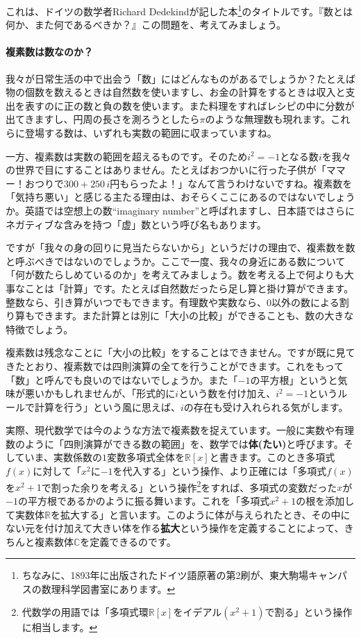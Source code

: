 これは、ドイツの数学者Richard Dedekindが記した本\footnote{ちなみに、1893年に出版されたドイツ語原著の第2刷が、東大駒場キャンパスの数理科学図書室にあります。}のタイトルです。『数とは何か、また何であるべきか？』この問題を、考えてみましょう。

\paragraph{複素数は数なのか？}

我々が日常生活の中で出会う「数」にはどんなものがあるでしょうか？たとえば物の個数を数えるときは自然数を使いますし、お金の計算をするときは収入と支出を表すのに正の数と負の数を使います。また料理をすればレシピの中に分数が出てきますし、円周の長さを測ろうとしたら$\pi$のような無理数も現れます。これらに登場する数は、いずれも実数の範囲に収まっていますね。

一方、複素数は実数の範囲を超えるものです。そのため$i^2=-1$となる数$i$を我々の世界で目にすることはありません。たとえばおつかいに行った子供が「ママー！\negthinspace おつりで$300+250\,i$円もらったよ！」なんて言うわけないですね。複素数を「気持ち悪い」と感じる主たる理由は、おそらくここにあるのではないでしょうか。英語では空想上の数``imaginary number''と呼ばれますし、日本語ではさらにネガティブな含みを持つ「虚」数という呼び名もあります。

ですが「我々の身の回りに見当たらないから」というだけの理由で、複素数を数と呼ぶべきではないのでしょうか。ここで一度、我々の身近にある数について「何が数たらしめているのか」を考えてみましょう。数を考える上で何よりも大事なことは「計算」です。たとえば自然数だったら足し算と掛け算ができます。整数なら、引き算がいつでもできます。有理数や実数なら、$0$以外の数による割り算もできます。また計算とは別に「大小の比較」ができることも、数の大きな特徴でしょう。

複素数は残念なことに「大小の比較」をすることはできません。ですが既に見てきたとおり、複素数では四則演算の全てを行うことができます。これをもって「数」と呼んでも良いのではないでしょうか。また「$-1$の平方根」というと気味が悪いかもしれませんが、「形式的に$i$という数を付け加え、$i^2=-1$というルールで計算を行う」という風に思えば、$i$の存在も受け入れられる気がします。

実際、現代数学では今のような方法で複素数を捉えています。一般に実数や有理数のように「四則演算ができる数の範囲」を、数学では\textbf{体(たい)}と呼びます。そしていま、実数係数の$1$変数多項式全体を$\mathbb{R}[x]$と書きます。このとき多項式$f(x)$に対して「$x^2$に$-1$を代入する」という操作、より正確には「多項式$f(x)$を$x^2+1$で割った余りを考える」という操作\footnote{代数学の用語では「多項式環$\mathbb{R}[x]$をイデアル$(x^2+1)$で割る」という操作に相当します。}をすれば、多項式の変数だった$x$が$-1$の平方根であるかのように振る舞います。これを「多項式$x^2+1$の根を添加して実数体$\mathbb{R}$を拡大する」と言います。このように体が与えられたとき、その中にない元を付け加えて大きい体を作る\textbf{拡大}という操作を定義することによって、きちんと複素数体$\mathbb{C}$を定義できるのです。

